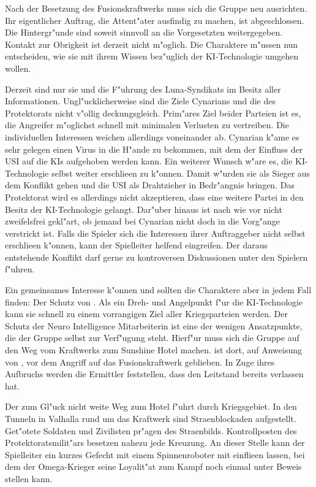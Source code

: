 
Nach der Besetzung des Fusionskraftwerks muss sich die Gruppe neu ausrichten. Ihr eigentlicher Auftrag, die Attent"ater ausfindig zu machen, ist abgeschlossen. Die Hintergr"unde sind soweit sinnvoll an die Vorgesetzten weitergegeben. Kontakt zur Obrigkeit ist derzeit nicht m"oglich. Die Charaktere m"ussen nun entscheiden, wie sie mit ihrem Wissen bez"uglich der KI-Technologie umgehen wollen. 

Derzeit sind nur sie und die F"uhrung des Luna-Syndikats im Besitz aller Informationen. Ungl"ucklicherweise sind die Ziele Cynarians und die des Protektorats nicht v"ollig deckungsgleich. Prim"ares Ziel beider Parteien ist es, die Angreifer m"oglichst schnell mit minimalen Verlusten zu vertreiben. Die individuellen Interessen weichen allerdings voneinander ab. Cynarian k"ame es sehr gelegen einen Virus in die H"ande zu bekommen, mit dem der Einfluss der USI auf die KIs aufgehoben werden kann. Ein weiterer Wunsch w"are es, die KI-Technologie selbst weiter erschlie\3en zu k"onnen. Damit w"urden sie als Sieger aus dem Konflikt gehen und die USI als Drahtzieher in Bedr"angnis bringen. Das Protektorat wird es allerdings nicht akzeptieren, dass eine weitere Partei in den Besitz der KI-Technologie gelangt. Dar"uber hinaus ist nach wie vor nicht zweifelsfrei gekl"art, ob jemand bei Cynarian nicht doch in die Vorg"ange verstrickt ist. Falls die Spieler sich die Interessen ihrer Auftraggeber nicht selbst erschlie\3en k"onnen, kann der Spielleiter helfend eingreifen. Der daraus entstehende Konflikt darf gerne zu kontroversen Diskussionen unter den Spielern f"uhren.

Ein gemeinsames Interesse k"onnen und sollten die Charaktere aber in jedem Fall finden: Der Schutz von \ml{}. Als ein Dreh- und Angelpunkt f"ur die KI-Technologie kann sie schnell zu einem vorrangigen Ziel aller Kriegsparteien werden. Der Schutz der Neuro Intelligence Mitarbeiterin ist eine der wenigen Ansatzpunkte, die der Gruppe selbst zur Verf"ugung steht. Hierf"ur muss sich die Gruppe auf den Weg vom Kraftwerks zum Sunshine Hotel machen. \ml{} ist dort, auf Anweisung von \xl{}, vor dem Angriff auf das Fusionskraftwerk geblieben. In Zuge ihres Aufbruchs werden die Ermittler feststellen, dass \xl{} den Leitstand bereits verlassen hat. 

Der zum Gl"uck nicht weite Weg zum Hotel f"uhrt durch Kriegsgebiet. In den Tunneln in Valhalla rund um das Kraftwerk sind Stra\3enblockaden aufgestellt. Get"otete Soldaten und Zivilisten pr"agen des Stra\3enbilds. Kontrollposten des Protektoratsmilit"ars besetzen nahezu jede Kreuzung. An dieser Stelle kann der Spielleiter ein kurzes Gefecht mit einem Spinnenroboter mit einflie\3en lassen, bei dem der Omega-Krieger seine Loyalit"at zum Kampf noch einmal unter Beweis stellen kann.

